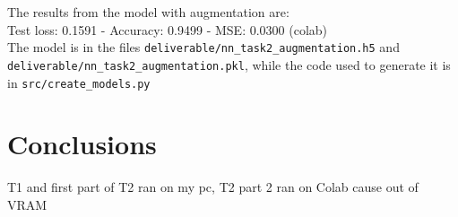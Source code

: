 \documentclass[11pt]{scrartcl}
\begin{document}
		The results from the model with augmentation are:\\
		
		Test loss: 0.1591 - Accuracy: 0.9499 - MSE: 0.0300 (colab)\\

		The model is in the files \texttt{deliverable/nn\_task2\_augmentation.h5} and\\ 
		\texttt{deliverable/nn\_task2\_augmentation.pkl}, while the code used to generate 
		it is in \texttt{src/create\_models.py}


\section*{Conclusions}

	T1 and first part of T2 ran on my pc, T2 part 2 ran on Colab cause out of VRAM
\end{document}
